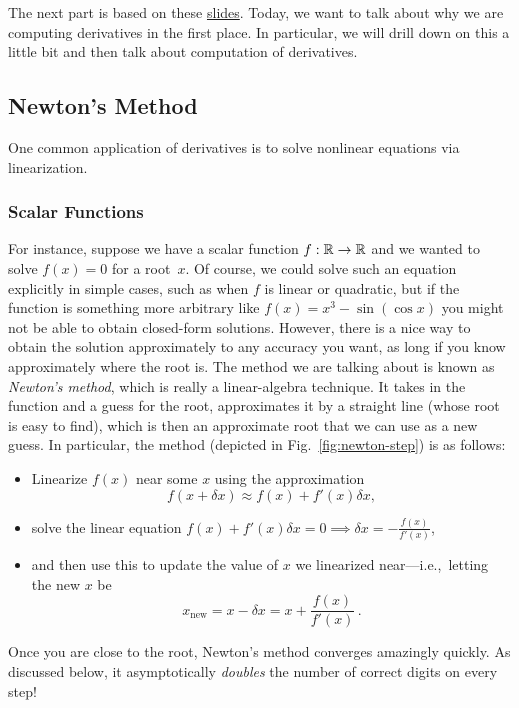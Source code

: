 The next part is based on these \href{https://docs.google.com/presentation/d/1U1lB5bhscjbxEuH5FcFwMl5xbHl0qIEkMf5rm0MO8uE/edit#slide=id.p}{slides}. Today, we want to talk about why we are computing derivatives in the first place. In particular, we will drill down on this a little bit and then talk about computation of derivatives.

\subsection{Newton's Method}
\label{sec:newton-roots}

One common application of derivatives is to solve nonlinear equations via linearization. 

\subsubsection{Scalar Functions}

For instance, suppose we have  a scalar function $f: \mathbb R \to \mathbb R$ and we wanted to solve $f(x) = 0$ for a root~$x$. Of course, we could solve such an equation explicitly in simple cases, such as when $f$ is linear or quadratic, but if the function is something more arbitrary like $f(x) = x^3 - \sin (\cos x)$ you might not be able to obtain closed-form solutions. However, there is a nice way to obtain the solution approximately to any accuracy you want, as long if you know approximately where the root is. The method we are talking about is known as \emph{Newton's method}, which is really a linear-algebra technique. It takes in the function and a guess for the root, approximates it by a straight line (whose root is easy to find), which is then an approximate root that we can use as a new guess. In particular, the method (depicted in Fig.~\ref{fig:newton-step}) is as follows: 
\begin{itemize}
    \item Linearize $f(x)$ near some $x$ using the approximation 
    \[
    f(x + \delta x) \approx f(x) + f'(x) \delta x,
    \]
    \item solve the linear equation $f(x) + f'(x) \delta x = 0 \implies \delta x = -\frac{f(x)}{f'(x)}$,
    \item and then use this to update the value of $x$ we linearized near---i.e.,~letting the new $x$ be $$x_\text{new} = x - \delta x = x + \frac{f(x)}{f'(x)} \, .$$
\end{itemize}
Once you are close to the root, Newton's method converges amazingly quickly.  As discussed below, it asymptotically \emph{doubles} the number of correct digits on every step!

